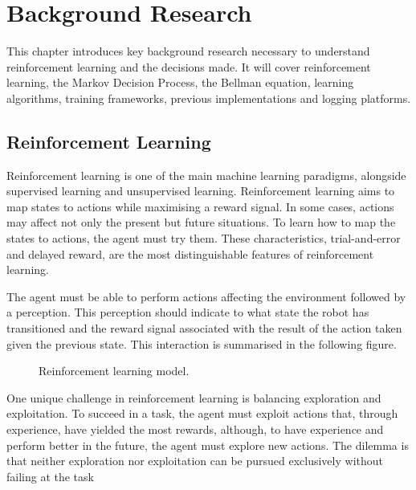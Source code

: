 \chapter{Background Research}
This chapter introduces key background research necessary to understand reinforcement learning and the decisions made. It will cover reinforcement learning, the Markov Decision Process, the Bellman equation, learning algorithms, training frameworks, previous implementations and logging platforms.

\section{Reinforcement Learning}
Reinforcement learning is one of the main machine learning paradigms, alongside supervised learning and unsupervised learning. 
Reinforcement learning aims to map states to actions while maximising a reward signal. In some cases, actions may affect not only the present but future situations. 
To learn how to map the states to actions, the agent must try them. These characteristics, trial-and-error and delayed reward, are the most distinguishable features of reinforcement learning.

The agent must be able to perform actions affecting the environment followed by a perception. This perception should indicate to what state the robot has transitioned and the reward signal associated with the result of the action taken given the previous state. This interaction is summarised in the following figure.

\begin{figure}[H]
 \centering
{}
\caption{Reinforcement learning model.}
\end{figure}
One unique challenge in reinforcement learning is balancing exploration and exploitation.
To succeed in a task, the agent must exploit actions that, through experience, have yielded the most rewards, although, 
to have experience and perform better in the future, the agent must explore new actions. 
The dilemma is that neither exploration nor exploitation can be pursued exclusively without failing at the task
\cite{reinforcement_learning}

